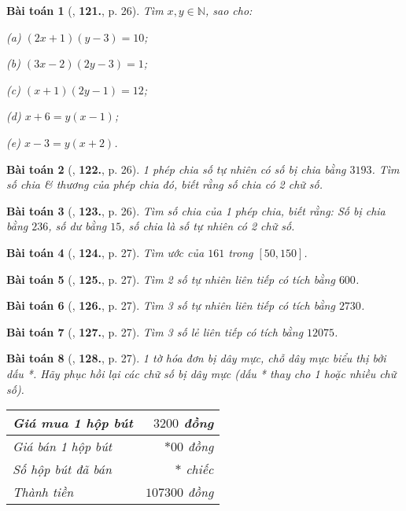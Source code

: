 \documentclass[oneside]{book}
\numberwithin{equation}{section}
\newtheorem{baitoan}{Bài toán}[section]
\begin{document}
\begin{baitoan}[\cite{Binh_Toan_6_tap_1}, \textbf{121.}, p. 26]
	Tìm $x,y\in\mathbb{N}$, sao cho:
	\begin{enumerate*}
		\item[(a)] $(2x + 1)(y - 3) = 10$;
		\item[(b)] $(3x - 2)(2y - 3) = 1$;
		\item[(c)] $(x + 1)(2y - 1) = 12$;
		\item[(d)] $x + 6 = y(x - 1)$;
		\item[(e)] $x - 3 = y(x + 2)$.
	\end{enumerate*}
\end{baitoan}

\begin{baitoan}[\cite{Binh_Toan_6_tap_1}, \textbf{122.}, p. 26]
	1 phép chia số tự nhiên có số bị chia bằng $3193$. Tìm số chia \& thương của phép chia đó, biết rằng số chia có 2 chữ số.
\end{baitoan}

\begin{baitoan}[\cite{Binh_Toan_6_tap_1}, \textbf{123.}, p. 26]
	Tìm số chia của 1 phép chia, biết rằng: Số bị chia bằng $236$, số dư bằng $15$, số chia là số tự nhiên có 2 chữ số.
\end{baitoan}

\begin{baitoan}[\cite{Binh_Toan_6_tap_1}, \textbf{124.}, p. 27]
	Tìm ước của $161$ trong $[50,150]$.
\end{baitoan}

\begin{baitoan}[\cite{Binh_Toan_6_tap_1}, \textbf{125.}, p. 27]
	Tìm 2 số tự nhiên liên tiếp có tích bằng $600$.
\end{baitoan}

\begin{baitoan}[\cite{Binh_Toan_6_tap_1}, \textbf{126.}, p. 27]
	Tìm 3 số tự nhiên liên tiếp có tích bằng $2730$.
\end{baitoan}

\begin{baitoan}[\cite{Binh_Toan_6_tap_1}, \textbf{127.}, p. 27]
	Tìm 3 số lẻ liên tiếp có tích bằng $12075$.
\end{baitoan}

\begin{baitoan}[\cite{Binh_Toan_6_tap_1}, \textbf{128.}, p. 27]
	1 tờ hóa đơn bị dây mực, chỗ dây mực biểu thị bởi dấu *. Hãy phục hồi lại các chữ số bị dây mực (dấu * thay cho 1 hoặc nhiều chữ số).
	\begin{table}[H]
		\centering
		\begin{tabular}{|l|r|}
			\hline
			Giá mua 1 hộp bút & $3200$ đồng \\
			\hline
			Giá bán 1 hộp bút & $*00$ đồng \\
			\hline
			Số hộp bút đã bán & $*$ chiếc \\
			\hline
			\textit{Thành tiền} & $107300$ đồng \\
			\hline
		\end{tabular}
	\end{table}
\end{baitoan}
\end{document}
